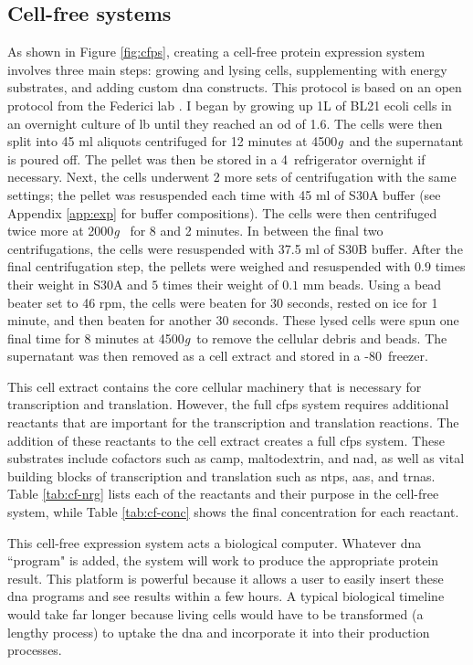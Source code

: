 \subsection{Cell-free systems}
As shown in Figure \ref{fig:cfps}, creating a cell-free protein expression system involves three main steps: growing and lysing cells, supplementing with energy substrates, and adding custom \gls{dna} constructs.
This protocol is based on an open protocol from the Federici lab \cite{medina2017cfps}.
I began by growing up 1L of BL21 \gls{ecoli} cells in an overnight culture of \gls{lb} until they reached an \gls{od} of 1.6.
The cells were then split into 45 \gls{ml} aliquots centrifuged for 12 minutes at 4500\textit{g}~and the supernatant is poured off.
The pellet was then be stored in a 4\degree~refrigerator overnight if necessary.
Next, the cells underwent 2 more sets of centrifugation with the same settings; the pellet was resuspended each time with 45 \gls{ml} of S30A buffer (see Appendix \ref{app:exp} for buffer compositions).
The cells were then centrifuged twice more at 2000\textit{g}~ for 8 and 2 minutes.
In between the final two centrifugations, the cells were resuspended with 37.5 \gls{ml} of S30B buffer.
After the final centrifugation step, the pellets were weighed and resuspended with $0.9$ times their weight in S30A and $5$ times their weight of $0.1$ mm beads.
Using a bead beater set to 46 rpm, the cells were beaten for 30 seconds, rested on ice for 1 minute, and then beaten for another 30 seconds.
These lysed cells were spun one final time for 8 minutes at 4500\textit{g}~to remove the cellular debris and beads.
The supernatant was then removed as a cell extract and stored in a -80\degree~freezer.

This cell extract contains the core cellular machinery that is necessary for transcription and translation.
However, the full \gls{cfps} system requires additional reactants that are important for the transcription and translation reactions.
The addition of these reactants to the cell extract creates a full \gls{cfps} system.
These substrates include cofactors such as \gls{camp}, maltodextrin, and \gls{nad}, as well as vital building blocks of transcription and translation such as \glspl{ntp}, \glspl{aa}, and \glspl{trna}.
Table \ref{tab:cf-nrg} lists each of the reactants and their purpose in the cell-free system, while Table \ref{tab:cf-conc} shows the final concentration for each reactant.

This cell-free expression system acts a biological computer.
Whatever \gls{dna} ``program" is added, the system will work to produce the appropriate protein result.
This platform is powerful because it allows a user to easily insert these \gls{dna} programs and see results within a few hours.
A typical biological timeline would take far longer because living cells would have to be transformed (a lengthy process) to uptake the \gls{dna} and incorporate it into their production processes.

